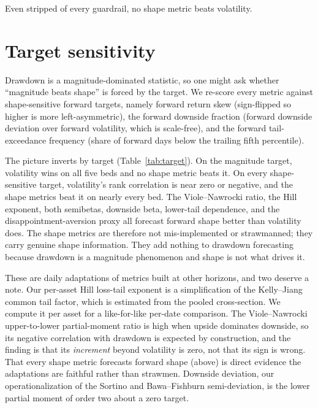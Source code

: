 \documentclass[sigconf,nonacm]{acmart}
\begin{document}
Even stripped of every guardrail, no shape metric beats volatility.

\section{Target sensitivity}\label{app:target}
Drawdown is a magnitude-dominated statistic, so one might ask whether
``magnitude beats shape'' is forced by the target. We re-score every metric against
shape-sensitive forward targets, namely forward return skew (sign-flipped so higher is more
left-asymmetric), the forward downside fraction (forward downside deviation over
forward volatility, which is scale-free), and the forward tail-exceedance frequency
(share of forward days below the trailing fifth percentile).

The picture inverts by target (Table~\ref{tab:target}). On the magnitude target,
volatility wins on all five beds and no shape metric beats it. On every shape-sensitive
target, volatility's rank correlation is near zero or negative, and the shape metrics
beat it on nearly every bed. The Viole--Nawrocki ratio, the Hill exponent, both
semibetas, downside beta, lower-tail dependence, and the disappointment-aversion proxy
all forecast forward shape better than volatility does. The shape metrics are therefore
not mis-implemented or strawmanned; they carry genuine shape information. They add
nothing to drawdown forecasting because drawdown is a magnitude phenomenon and shape
is not what drives it.

These are daily adaptations of metrics built at other horizons, and two deserve a note.
Our per-asset Hill loss-tail exponent is a simplification of the Kelly--Jiang common tail
factor, which is estimated from the pooled cross-section. We compute it per asset for a
like-for-like per-date comparison. The Viole--Nawrocki upper-to-lower partial-moment ratio
is high when upside dominates downside, so its negative correlation with drawdown is
expected by construction, and the finding is that its \emph{increment} beyond volatility
is zero, not that its sign is wrong. That every shape metric forecasts forward shape
(above) is direct evidence the adaptations are faithful rather than strawmen. Downside
deviation, our operationalization of the Sortino and Bawa--Fishburn semi-deviation, is
the lower partial moment of order two about a zero target.
\end{document}
